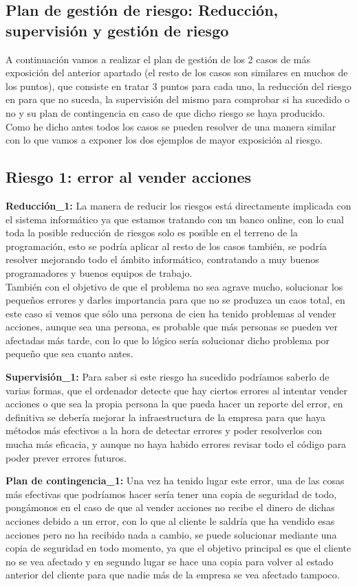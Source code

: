 \subsection{Plan de gestión de riesgo: Reducción, supervisión y gestión de riesgo}
A continuación vamos a realizar el plan de gestión de los 2 casos de más exposición del anterior apartado (el resto de los casos son similares en muchos de los puntos), que consiste en tratar 3 puntos para cada uno, la reducción del riesgo en para que no suceda, la supervisión del mismo para comprobar si ha sucedido o no y su plan de contingencia en caso de que dicho riesgo se haya producido.\\
Como he dicho antes todos los casos se pueden resolver de una manera similar con lo que vamos a exponer los dos ejemplos de mayor exposición al riesgo.
\subsection{Riesgo 1: error al vender acciones}
\textbf{Reducción\_1:} La manera de reducir los riesgos está directamente implicada con el sistema informático ya que estamos tratando con un banco online, con lo cual toda la posible reducción de riesgos solo es posible en el terreno de la programación, esto se podría aplicar al resto de los casos también, se podría resolver mejorando todo el ámbito informático, contratando a muy buenos programadores y buenos equipos de trabajo.\\
También con el objetivo de que el problema no sea agrave mucho, solucionar los pequeños errores y darles importancia para que no se produzca un caos total, en este caso si vemos que sólo una persona de cien ha tenido problemas al vender acciones, aunque sea una persona, es probable que más personas se pueden ver afectadas más tarde, con lo que lo lógico sería solucionar dicho problema por pequeño que sea cuanto antes.

\textbf{Supervisión\_1:} Para saber si este riesgo ha sucedido podríamos saberlo de varias formas, que el ordenador detecte que hay ciertos errores al intentar vender acciones o que sea la propia persona la que pueda hacer un reporte del error, en definitiva se debería mejorar la infraestructura de la empresa para que haya métodos más efectivos a la hora de detectar errores y poder resolverlos con mucha más eficacia, y aunque no haya habido errores revisar todo el código para poder prever errores futuros.

\textbf{Plan de contingencia\_1:} Una vez ha tenido lugar este error, una de las cosas más efectivas que podríamos hacer sería tener una copia de seguridad de todo, pongámonos en el caso de que al vender acciones no recibe el dinero de dichas acciones debido a un error, con lo que al cliente le saldría que ha vendido esas acciones pero no ha recibido nada a cambio, se puede solucionar mediante una copia de seguridad en todo momento, ya que el objetivo principal es que el cliente no se vea afectado y en segundo lugar se hace una copia para volver al estado anterior del cliente para que nadie más de la empresa se vea afectado tampoco.


